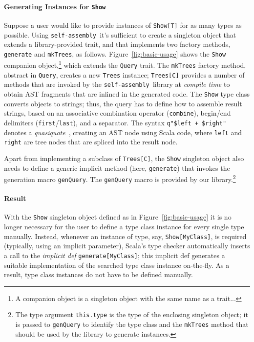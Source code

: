 \documentclass[preprint,nocopyrightspace]{sigplanconf}
\newcommand{\selfassembly}{\texttt{self-assembly~}}
\begin{document}
\paragraph{Generating Instances for \texttt{Show}} Suppose a user would like
to provide instances of \verb|Show[T]| for as many
types as possible. Using \selfassembly it's sufficient to create a singleton
object that extends a library-provided trait, and that implements two factory
methods, \verb|generate| and \verb|mkTrees|, as follows.
Figure~\ref{fig:basic-usage} shows the \verb|Show| companion object,\footnote{A companion
object is a singleton object with the same name as a trait...} which extends
the \verb|Query| trait. The \verb|mkTrees| factory method, abstract in \verb|Query|,
creates a new \verb|Trees| instance; \verb|Trees[C]| provides a number of methods that
are invoked by the \selfassembly library at \emph{compile time} to obtain AST fragments that are
inlined in the generated code. The \verb|Show| type class converts objects to
strings; thus, the query has to define how to assemble result strings, based
on an associative combination operator (\verb|combine|), begin/end delimiters
(\verb|first|/\verb|last|), and a separator. The syntax
\verb|q"$left + $right"| denotes a \emph{quasiquote}~\cite{Quasiquotes},
creating an AST node using Scala code, where \verb|left| and \verb|right|
are tree nodes that are spliced into the result node.

Apart from implementing a subclass of \verb|Trees[C]|, the \verb|Show|
singleton object also needs to define a generic implicit method (here,
\verb|generate|) that invokes the generation macro \verb|genQuery|. The
\verb|genQuery| macro is provided by our library.\footnote{The type argument
\texttt{this.type} is the type of the enclosing singleton object; it is passed
to \texttt{genQuery} to identify the type class and the \texttt{mkTrees}
method that should be used by the library to generate instances.}

\paragraph{Result} With the \verb|Show| singleton object defined as in Figure~\ref{fig:basic-usage}
it is no longer necessary for the user to define a type class instance for every single type manually.
Instead, whenever an instance of type, say, \verb|Show[MyClass]|, is required
(typically, using an implicit parameter), Scala's type checker automatically inserts
a call to the \emph{implicit def} \verb|generate[MyClass]|; this implicit def generates a
suitable implementation of the searched type class instance on-the-fly. As a result,
type class instances do not have to be defined manually.
\end{document}
